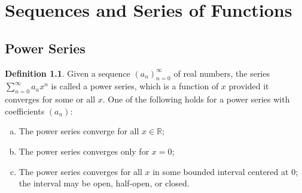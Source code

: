\documentclass[12pt, lettersize]{book}
\theoremstyle{plain}
\theoremstyle{definition}
\newtheorem{dfn}[thm]{Definition}
\theoremstyle{remark}
\newcommand{\R}{\mathbb{R}}
\begin{document}
	\chapter{Sequences and Series of Functions}
		\newpage
		\section{Power Series}
			\begin{dfn}
			Given a sequence $(a_n)_{n=0}^{\infty}$ of real numbers, the series $\sum_{n=0}^{\infty}a_nx^n$ is called 
			a power series, which is a function of $x$ provided it converges for some or all $x$. One of the following
			holds for a power series with coefficients $(a_n)$:
			\begin{enumerate}[(a)]
				\item The power series converge for all $x\in\R$;
				\item The power series converges only for $x=0$;
				\item The power series converges for all $x$ in some bounded interval centered at $0$; the interval may be
				open, half-open, or closed.
			\end{enumerate}
			\end{dfn}
			
\end{document}
